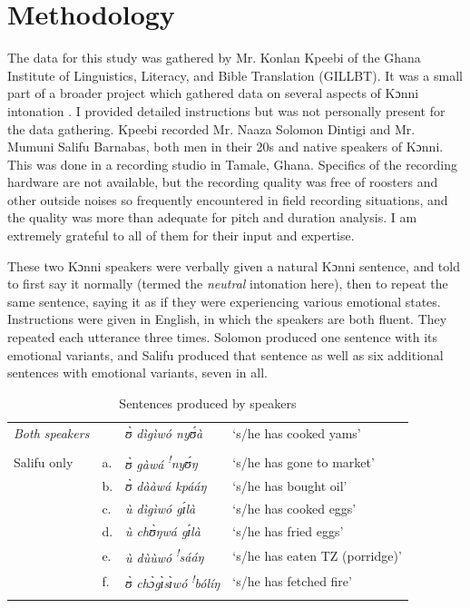 \documentclass[output=paper]{langsci/langscibook}
\begin{document}
\section{Methodology}
The data for this study was gathered by Mr. Konlan Kpeebi of the Ghana Institute of Linguistics, Literacy, and Bible Translation (GILLBT). It was a small part of a broader project which gathered data on several aspects of Kɔnni intonation \citep{cahill2016intonation}. I provided detailed instructions but was not personally present for the data gathering. Kpeebi recorded Mr. Naaza Solomon Dintigi and Mr. Mumuni Salifu Barnabas, both men in their 20s and native speakers of Kɔnni. This was done in a recording studio in Tamale, Ghana. Specifics of the recording hardware are not available, but the recording quality was free of roosters and other outside noises so frequently encountered in field recording situations, and the quality was more than adequate for pitch and duration analysis. I am extremely grateful to all of them for their input and expertise.


These two Kɔnni speakers were verbally given a natural Kɔnni sentence, and told to first say it normally (termed the \emph{neutral} intonation here), then to repeat the same sentence, saying it as if they were experiencing various emotional states. Instructions were given in English, in which the speakers are both fluent. They repeated each utterance three times. Solomon produced one sentence with its emotional variants, and Salifu produced that sentence as well as six additional sentences with emotional variants, seven in all.


\begin{table}
\begin{tabular}{llll}
\lsptoprule

\emph{\textup{Both speakers}} & & \textit{ʊ̀ dìgìwó nyʊ́à} & `s/he has cooked yams'\\ & & & \\
Salifu only & a. & \textit{ʊ̀ gàwá} \textit{\textsuperscript{!}}\textit{nyʊ́ŋ} & `s/he has gone to market'\\
& b. & \textit{ʊ̀ dààwá kpááŋ} & `s/he has bought oil'\\
& c. & \textit{ù dìgìwó gɪ́là} & `s/he has cooked eggs'\\
& d. & \textit{ù chʊ̀ŋwá gɪ́là} & `s/he has fried eggs'\\
& e. & \textit{ù dùùwó} \textit{\textsuperscript{!}}\textit{sááŋ} & `s/he has eaten TZ (porridge)'\\
& f. & \textit{ʊ̀ chɔ̀gɪ̀sɪ̀wó} \textit{\textsuperscript{!}}\textit{bólíŋ} & `s/he has fetched fire'  \\
\lspbottomrule
\end{tabular}

\caption{Sentences produced by speakers}
\label{tab:2.cahill}

\end{table}
\end{document}
